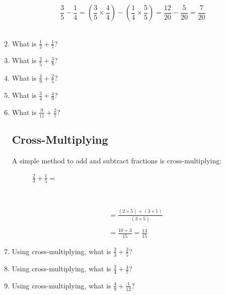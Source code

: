 \documentclass[14pt]{article}
\begin{document}
\begin{enumerate}
$$\frac{3}{5} - \frac{1}{4} = \left(\frac{3}{5} \times \frac{4}{4}\right) - \left(\frac{1}{4} \times \frac{5}{5}\right) = \frac{12}{20} - \frac{5}{20} = \frac{7}{20}$$\\

\item What is $\frac{1}{2}+\frac{1}{7}$?
\item What is $\frac{2}{5}+\frac{3}{8}$?
\item What is $\frac{4}{9}+\frac{2}{5}$?
\item What is $\frac{3}{4}+\frac{4}{9}$?
\item What is $\frac{9}{11}+\frac{2}{7}$?

\subsection*{Cross-Multiplying}

A simple method to add and subtract fractions is cross-multiplying:
\begin{figure}[ht]
\begin{minipage}[ht]{0.4\linewidth} \centering
\begin{large}$\frac{2}{3}+\frac{1}{5}=$\end{large}\\
\vspace{8pt}
\end{minipage}
\begin{minipage}[ht]{0.6\linewidth} \centering 
\begin{center}
\begin{align*}
&= \frac{(2 \times 5) + (3 \times 1)}{(3 \times 5)}\\\\
&= \frac{10+3}{15} = \frac{13}{15}
\end{align*}
\end{center}
\end{minipage}
\end{figure}

\item Using cross-multiplying, what is $\frac{2}{3}+\frac{2}{5}$?
\item Using cross-multiplying, what is $\frac{3}{4}+\frac{4}{7}$?
\item Using cross-multiplying, what is $\frac{4}{9}+\frac{1}{12}$?\\


\end{enumerate}
\end{document}
